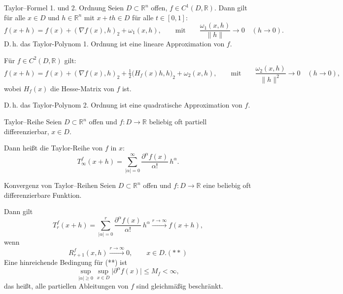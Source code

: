 \begin{korollar}{Taylor--Formel 1. und 2. Ordnung}
    Seien $D\subset\mathbb{R}^n$ offen, $f\in C^1(D,\mathbb{R})$.
    Dann gilt für alle $x\in D$ und $h\in\mathbb{R}^n$ mit $x+th\in D$ für alle $t\in[0,1]$:
    $$
    f(x+h)=f(x)+(\nabla f(x),h)_2+\omega_1(x,h),
    \qquad\text{mit}\qquad
    \frac{\omega_1(x,h)}{\|h\|}\longrightarrow 0\quad (h\to 0).
    $$
    D.\,h. das Taylor-Polynom 1. Ordnung ist eine lineare Approximation von $f$.

    Für $f\in C^2(D,\mathbb{R})$ gilt:
    $$
    f(x+h)=f(x)+(\nabla f(x),h)_2+\tfrac{1}{2}\big(H_f(x)h,h\big)_2+\omega_2(x,h),
    \qquad\text{mit}\qquad
    \frac{\omega_2(x,h)}{\|h\|^2}\longrightarrow 0\quad (h\to 0),
    $$
    wobei $H_f(x)$ die Hesse-Matrix von $f$ ist.

    D.\,h. das Taylor-Polynom 2. Ordnung ist eine quadratische Approximation von $f$.
\end{korollar}

\begin{definition}{Taylor--Reihe}
    Seien $D\subset\mathbb{R}^n$ offen und $f: D\to\mathbb{R}$ beliebig oft partiell differenzierbar, $x\in D$.

    Dann heißt die Taylor-Reihe von $f$ in $x$:
    $$
    T^{f}_{\infty}(x+h)=\sum_{|\alpha|=0}^{\infty}\frac{\partial^{\alpha}f(x)}{\alpha!}\,h^{\alpha}.
    $$
\end{definition}

\begin{korollar}{Konvergenz von Taylor--Reihen}
    Seien $D\subset\mathbb{R}^n$ offen und $f: D\to\mathbb{R}$ eine beliebig oft differenzierbare Funktion.

    Dann gilt
    $$
    T_r^f(x+h)=\sum_{|\alpha|=0}^r \frac{\partial^\alpha f(x)}{\alpha!}\,h^\alpha
    \xrightarrow{r\to\infty} f(x+h),
    $$
    wenn
    $$
    R_{r+1}^f(x,h)\xrightarrow{r\to\infty}0,\qquad x\in D. (**)
    $$
    Eine hinreichende Bedingung für (**) ist
    $$
    \sup_{|\alpha|\ge 0}\sup_{x\in D} \bigl|\partial^\alpha f(x)\bigr| \le M_f < \infty,
    $$
    das heißt, alle partiellen Ableitungen von $f$ sind gleichmäßig beschränkt.
\end{korollar}